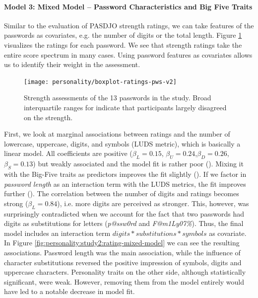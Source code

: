 \paragraph{Model 3: Mixed Model -- Password Characteristics and Big Five Traits}
Similar to the evaluation of PASDJO strength ratings, we can take features of the passwords as covariates, e.g. the number of digits or the total length. Figure \ref{fig:personality:study2:boxplot-ratings-pws} visualizes the ratings for each password. We see that strength ratings take the entire score spectrum in many cases. Using password features as covariates allows us to identify their weight in the assessment. 

\begin{figure}[htbp]
	\centering
	\texttt{[image: personality/boxplot-ratings-pws-v2]}
	\caption{\label{fig:personality:study2:boxplot-ratings-pws}Strength assessments of the 13 passwords in the study. Broad interquartile ranges for indicate that participants largely disagreed on the strength.}
\end{figure}

\makeatletter
First, we look at marginal associations between ratings and the number of lowercase, uppercase, digits, and symbols (LUDS metric), which is basically a linear model. All coefficients are positive ($\beta_{L} = 0.15$, $\beta_{U} = 0.24$,$\beta_{D} = 0.26$,$\beta_{S} = 0.13$) but weakly associated and the model fit is rather poor (). Mixing it with the Big-Five traits as predictors improves the fit slightly (). If we factor in \textit{password length} as an interaction term with the LUDS metrics, the fit improves further (). The correlation between the number of digits and ratings becomes strong ($\beta_{L} = 0.84$), i.e. more digits are perceived as stronger. This, however, was surprisingly contradicted when we account for the fact that two passwords had digits as substitutions for letters (\textit{p@ssw0rd} and \textit{F@m1Ly07\%}). Thus, the final model includes an interaction term $digits*substitutions*symbols$ as covariate. In Figure \ref{fig:personality:study2:rating-mixed-model} we can see the resulting associations. Password length was the main association, while the influence of character substitutions reversed the positive impression of symbols, digits and uppercase characters.
Personality traits on the other side, although statistically significant, were weak. However, removing them from the model entirely would have led to a notable decrease in model fit. 

